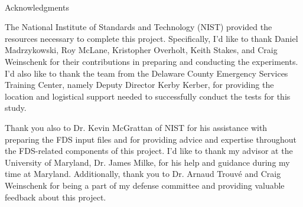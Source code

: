 
\renewcommand{\baselinestretch}{2}
\small\normalsize
\hbox{\ }
 
\vspace{-.65in}

\begin{center}
\large{Acknowledgments} 
\end{center} 

\vspace{1ex}

The National Institute of Standards and Technology (NIST) provided the resources necessary to complete this project. Specifically, I'd like to thank Daniel Madrzykowski, Roy McLane, Kristopher Overholt, Keith Stakes, and Craig Weinschenk for their contributions in preparing and conducting the experiments. I'd also like to thank the team from the Delaware County Emergency Services Training Center, namely Deputy Director Kerby Kerber, for providing the location and logistical support needed to successfully conduct the tests for this study.  

Thank you also to Dr. Kevin McGrattan of NIST for his assistance with preparing the FDS input files and for providing advice and expertise throughout the FDS-related components of this project. I'd like to thank my advisor at the University of Maryland, Dr. James Milke, for his help and guidance during my time at Maryland. Additionally, thank you to Dr. Arnaud Trouv\'e and Craig Weinschenk for being a part of my defense committee and providing valuable feedback about this project. 